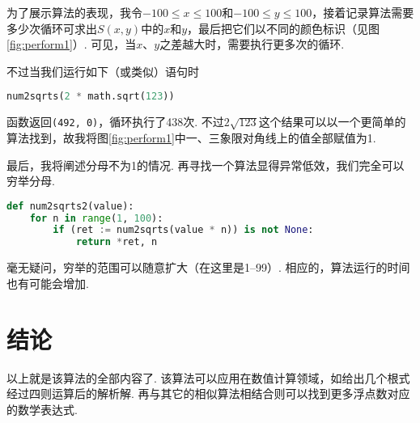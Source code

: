 \documentclass[a4paper, UTF8]{ctexart}
\begin{document}
为了展示算法的表现，我令$-100\leq x\leq100$和$-100\leq y\leq100$，接着记录算法需要多少次循环可求出$S(x,y)$中的$x$和$y$，最后把它们以不同的颜色标识（见图 \ref{fig:perform1}）. 可见，当$x$、$y$之差越大时，需要执行更多次的循环.

不过当我们运行如下（或类似）语句时
\begin{lstlisting}[language=python]
num2sqrts(2 * math.sqrt(123))
\end{lstlisting}
函数返回\verb|(492, 0)|，循环执行了438次. 不过$2\sqrt{123}$这个结果可以以一个更简单的算法找到，故我将图\ref{fig:perform1}中一、三象限对角线上的值全部赋值为1.

最后，我将阐述分母不为1的情况. 再寻找一个算法显得异常低效，我们完全可以穷举分母.
\begin{lstlisting}[language=python, name=example2]
def num2sqrts2(value):
    for n in range(1, 100):
        if (ret := num2sqrts(value * n)) is not None:
            return *ret, n
\end{lstlisting}
毫无疑问，穷举的范围可以随意扩大（在这里是1--99）. 相应的，算法运行的时间也有可能会增加.

\section{结论}
以上就是该算法的全部内容了. 该算法可以应用在数值计算领域，如给出几个根式经过四则运算后的解析解. 再与其它的相似算法相结合则可以找到更多浮点数对应的数学表达式.
\end{document}

